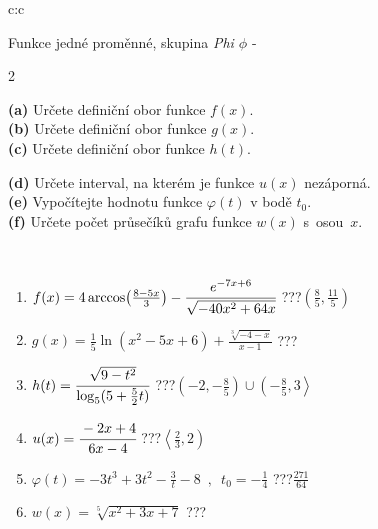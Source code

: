 \documentclass[10pt]{report}
\begin{document}
\begin{tabular}{c:c}
\begin{minipage}[c][104.5mm][t]{0.5\linewidth}
\begin{center}
\vspace{7mm}
{\huge Funkce jedné proměnné, skupina \textit{Phi $\phi$} -}\\[5mm]
\begin{minipage}{0.95\linewidth}
\begin{center}
{\small \begin{multicols}{2} \raggedright
\textbf{(a)} Určete definiční obor funkce \(f(x)\). \\[1mm]
\textbf{(b)} Určete definiční obor funkce \(g(x)\). \\[1mm]
\textbf{(c)} Určete definiční obor funkce \(h(t)\). \par \columnbreak
\textbf{(d)} Určete interval, na kterém je funkce \(u(x)\) nezáporná. \\[1mm]
\textbf{(e)} Vypočítejte hodnotu funkce \(\varphi(t)\) v bodě \(t_0\). \\[1mm]
\textbf{(f)} Určete počet průsečíků grafu funkce \(w(x)\) s~osou~\(x\). \\[1mm]
\end{multicols}
}
\end{center}
\end{minipage}
\\[4mm]
\begin{minipage}{0.79\linewidth}
\begin{center}
\begin{varwidth}{\linewidth}
\begin{enumerate}
\small
\item $f(x) = 4\arccos\!\left( \frac{8-5x}{3} \right) - \cfrac{e^{-7x+6}}{\sqrt{-40x^2+64x}}$\quad \dotfill\; ???\;\dotfill \quad $\left(\frac{8}{5} , \frac{11}{5}\right)$
\item $g(x) = \frac{1}{5} \ln{\!(x^2-5x+6)}+\frac{\sqrt[3]{-4-x}}{x-1}$\quad \dotfill\; ???\;\dotfill {}
\item $h(t) = \cfrac{\sqrt{9-t^2}}{\log_5(5+\frac{5}{2}t)}$\quad \dotfill\; ???\;\dotfill \quad $\left(-2 , -\frac{8}{5}\right)\cup\left(-\frac{8}{5} , 3\right\rangle$
\item $u(x) = \cfrac{-2x+4}{6x-4}$\quad \dotfill\; ???\;\dotfill \quad $\left\langle\frac{2}{3} , 2\right)$
\item $\varphi(t) = -3t^3+3t^2-\frac{3}{t}-8 \enspace , \enspace t_0=-\frac{1}{4}$\quad \dotfill\; ???\;\dotfill \quad $\frac{271}{64}$
\item $w(x) = \sqrt[5]{x^2+3x+7}$\quad \dotfill\; ???\;\dotfill {}

\end{enumerate}
\end{varwidth}
\end{center}
\end{minipage}
\end{center}
\end{minipage}
\end{tabular}
\end{document}

